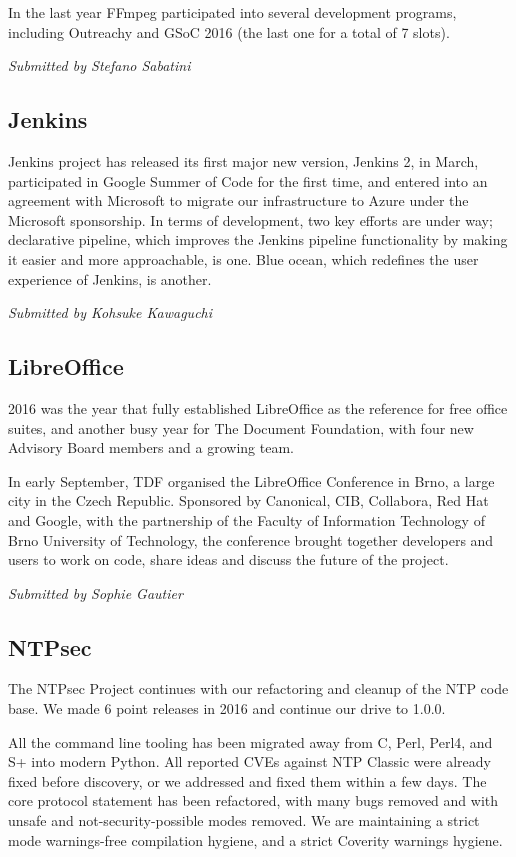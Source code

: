 \documentclass[letterpaper]{report}
\begin{document}
In the last year FFmpeg participated into several development programs,
including Outreachy and GSoC 2016 (the last one for a total of 7 slots).

{\em Submitted by Stefano Sabatini}

\subsection{Jenkins}

Jenkins project has released its first major new version, Jenkins 2, in
March, participated in Google Summer of Code for the first time, and
entered into an agreement with Microsoft to migrate our infrastructure
to Azure under the Microsoft sponsorship. In terms of development, two
key efforts are under way; declarative pipeline, which improves the
Jenkins pipeline functionality by making it easier and more
approachable, is one.  Blue ocean, which redefines the user experience
of Jenkins, is another.

{\em Submitted by Kohsuke Kawaguchi}

\subsection{LibreOffice}

2016 was the year that fully established LibreOffice as the reference
for free office suites, and another busy year for The Document
Foundation, with four new Advisory Board members and a growing team.

In early September, TDF organised the LibreOffice Conference in Brno, a
large city in the Czech Republic. Sponsored by Canonical, CIB,
Collabora, Red Hat and Google, with the partnership of the Faculty of
Information Technology of Brno University of Technology, the conference
brought together developers and users to work on code, share ideas and
discuss the future of the project.

{\em Submitted by Sophie Gautier}

\subsection{NTPsec}

The NTPsec Project continues with our refactoring and cleanup of the NTP
code base.  We made 6 point releases in 2016 and continue our drive to 1.0.0.

All the command line tooling has been migrated away from C, Perl, Perl4,
and S+ into modern Python.  All reported CVEs against NTP Classic were
already fixed before discovery, or we addressed and fixed them within a
few days.  The core protocol statement has been refactored, with many
bugs removed and with unsafe and not-security-possible modes removed.
We are maintaining a strict mode warnings-free compilation hygiene, and
a strict Coverity warnings hygiene.
\end{document}
